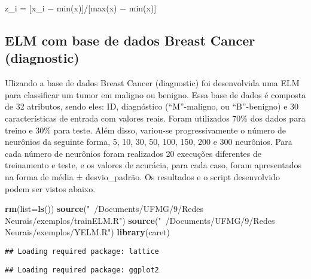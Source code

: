 \documentclass[
]{article}
\newenvironment{Shaded}{\begin{snugshade}}{\end{snugshade}}
\newcommand{\DataTypeTok}[1]{\textcolor[rgb]{0.13,0.29,0.53}{#1}}
\newcommand{\KeywordTok}[1]{\textcolor[rgb]{0.13,0.29,0.53}{\textbf{#1}}}
\newcommand{\NormalTok}[1]{#1}
\newcommand{\StringTok}[1]{\textcolor[rgb]{0.31,0.60,0.02}{#1}}
\begin{document}
z\_i = {[}x\_i − min(x){]}/{[}max(x) − min(x){]}

\hypertarget{elm-com-base-de-dados-breast-cancer-diagnostic}{%
\subsection{ELM com base de dados Breast Cancer
(diagnostic)}\label{elm-com-base-de-dados-breast-cancer-diagnostic}}

Ulizando a base de dados Breast Cancer (diagnostic) foi desenvolvida uma
ELM para classificar um tumor em maligno ou benigno. Essa base de dados
é composta de 32 atributos, sendo eles: ID, diagnóstico (``M''-maligno,
ou ``B''-benigno) e 30 características de entrada com valores reais.
Foram utilizados 70\% dos dados para treino e 30\% para teste. Além
disso, variou-se progressivamente o número de neurônios da seguinte
forma, 5, 10, 30, 50, 100, 150, 200 e 300 neurônios. Para cada número de
neurônios foram realizados 20 execuções diferentes de treinamento e
teste, e os valores de acurácia, para cada caso, foram apresentados na
forma de média ± desvio\_padrão. Os resultados e o script desenvolvido
podem ser vistos abaixo.

\begin{Shaded}
\begin{Highlighting}[]
\KeywordTok{rm}\NormalTok{(}\DataTypeTok{list=}\KeywordTok{ls}\NormalTok{())}
\KeywordTok{source}\NormalTok{(}\StringTok{"~/Documents/UFMG/9/Redes Neurais/exemplos/trainELM.R"}\NormalTok{)}
\KeywordTok{source}\NormalTok{(}\StringTok{"~/Documents/UFMG/9/Redes Neurais/exemplos/YELM.R"}\NormalTok{)}
\KeywordTok{library}\NormalTok{(caret)}
\end{Highlighting}
\end{Shaded}

\begin{verbatim}
## Loading required package: lattice
\end{verbatim}

\begin{verbatim}
## Loading required package: ggplot2
\end{verbatim}
\end{document}
